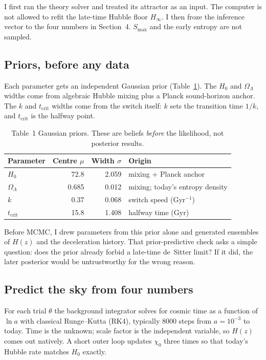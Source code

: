 \documentclass[12pt,letterpaper]{article}
\newcommand{\tcrit}{t_{\mathrm{crit}}}
\begin{document}
I first ran the theory solver and treated its attractor as an input.
The computer is not allowed to refit the late-time Hubble floor
$H_\infty$. I then froze the inference vector to the four numbers in
Section~4. $S_{\max}$ and the early entropy are not sampled.

\subsection{Priors, before any data}

Each parameter gets an independent Gaussian prior
(Table~\ref{tab:priors}). The $H_0$ and $\Omega_\Lambda$ widths come
from algebraic Hubble mixing plus a Planck sound-horizon anchor. The
$k$ and $\tcrit$ widths come from the switch itself: $k$ sets the
transition time $1/k$, and $\tcrit$ is the halfway point.

\begin{table}[H]
\centering
\caption{Table~1 Gaussian priors. These are beliefs \emph{before} the
likelihood, not posterior results.}
\label{tab:priors}
\begin{tabular}{lrrl}
\toprule
Parameter & Centre $\mu$ & Width $\sigma$ & Origin \\
\midrule
$H_0$          & 72.8  & 2.059 & mixing + Planck anchor \\
$\Omega_\Lambda$ & 0.685 & 0.012 & mixing; today's entropy density \\
$k$            & 0.37  & 0.068 & switch speed (Gyr$^{-1}$) \\
$\tcrit$       & 15.8  & 1.408 & halfway time (Gyr) \\
\bottomrule
\end{tabular}
\end{table}

Before MCMC, I drew parameters from this prior alone and generated
ensembles of $H(z)$ and the deceleration history. That prior-predictive
check asks a simple question: does the prior already forbid a late-time
de~Sitter limit? If it did, the later posterior would be untrustworthy
for the wrong reason.

\subsection{Predict the sky from four numbers}

For each trial $\theta$ the background integrator solves for cosmic
time as a function of $\ln a$ with classical Runge--Kutta (RK4),
typically 8000 steps from $a=10^{-3}$ to today. Time is the unknown;
scale factor is the independent variable, so $H(z)$ comes out natively.
A short outer loop updates $\chi_0$ three times so that today's Hubble
rate matches $H_0$ exactly.
\end{document}
